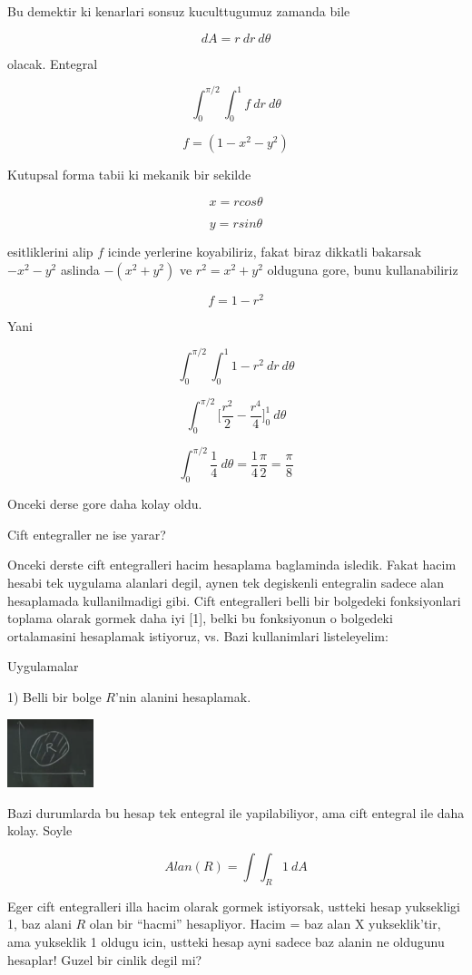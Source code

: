 \documentclass[12pt,fleqn]{article}
\begin{document}
Bu demektir ki kenarlari sonsuz kuculttugumuz zamanda bile 

\[ dA = r \ dr \ d\theta \]

olacak. Entegral

\[ \int_0^{\pi/2} \int_0^1  f \ dr \ d\theta\]

\[ f =  (1-x^2-y^2)\]

Kutupsal forma tabii ki mekanik bir sekilde

\[ x = rcos\theta \]

\[ y = rsin\theta \]

esitliklerini alip $f$ icinde yerlerine koyabiliriz, fakat biraz dikkatli
bakarsak $-x^2-y^2$ aslinda $-(x^2+y^2)$ ve $r^2=x^2+y^2$ olduguna gore,
bunu kullanabiliriz

\[ f =   1-r^2 \]

Yani

\[ \int_0^{\pi/2} \int_0^1  1-r^2 \ dr \ d\theta\]


\[ \int_0^{\pi/2}  \bigg[ \frac{r^2}{2} - \frac{r^4}{4} \bigg]_0^1 \ d\theta\]


\[ \int_0^{\pi/2}  \frac{1}{4} \ d\theta = \frac{1}{4} \frac{\pi}{2} =
\frac{\pi}{8}
\]

Onceki derse gore daha kolay oldu. 

Cift entegraller ne ise yarar? 

Onceki derste cift entegralleri hacim hesaplama baglaminda isledik. Fakat
hacim hesabi tek uygulama alanlari degil, aynen tek degiskenli entegralin
sadece alan hesaplamada kullanilmadigi gibi. Cift entegralleri
belli bir bolgedeki fonksiyonlari toplama olarak gormek daha iyi [1], belki bu
fonksiyonun o bolgedeki ortalamasini hesaplamak istiyoruz, vs. Bazi
kullanimlari listeleyelim:

Uygulamalar 

1) Belli bir bolge $R$'nin alanini hesaplamak. 

\includegraphics[height=2cm]{17_3.png}

Bazi durumlarda bu hesap tek entegral ile yapilabiliyor, ama cift entegral
ile daha kolay. Soyle

\[ Alan(R) = \int \int_R 1 \ dA \]

Eger cift entegralleri illa hacim olarak gormek istiyorsak, ustteki hesap
yuksekligi 1, baz alani $R$ olan bir ``hacmi'' hesapliyor. Hacim = baz alan
X yukseklik'tir, ama yukseklik 1 oldugu icin, ustteki hesap ayni sadece baz
alanin ne oldugunu hesaplar! Guzel bir cinlik degil mi?
\end{document}
